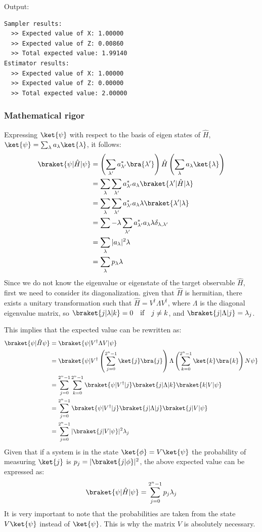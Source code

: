 \documentclass[12pt, oneside]{book}
\theoremstyle{definition}
\theoremstyle{definition}
\theoremstyle{remark}
\begin{document}
Output:
\begin{lstlisting}
Sampler results:
  >> Expected value of X: 1.00000
  >> Expected value of Z: 0.00860
  >> Total expected value: 1.99140
Estimator results:
  >> Expected value of X: 1.00000
  >> Expected value of Z: 0.00000
  >> Total expected value: 2.00000
\end{lstlisting}
\subsubsection{Mathematical rigor}
Expressing $\ket{\psi}$ with respect to the basis of eigen states of $\hat{H}$,$\ket{\psi}=\sum_{\lambda}a_{\lambda}\ket{\lambda}$, it follows:
\begin{align*}
\braket{\psi|\hat{H}|\psi}&=\left(\sum_{\lambda'}a_{\lambda'}^*\bra{\lambda'}\right)\hat{H}\left(\sum_{\lambda}a_{\lambda}\ket{\lambda}\right)\\
&=\sum_{\lambda}\sum_{\lambda'} a_{\lambda'}^*a_{\lambda} \braket{\lambda'|\hat{H}|\lambda}\\
&=\sum_{\lambda}\sum_{\lambda'}a_{\lambda'}^*a_{\lambda}\lambda \braket{\lambda'|\lambda}\\
&=\sum-{\lambda}\sum_{\lambda'}a_{\lambda'}^*a_{\lambda}\lambda\delta_{\lambda,\lambda'}\\
&=\sum_{\lambda}|a_{\lambda}|^2\lambda\\
&=\sum_{\lambda}p_{\lambda}\lambda
\end{align*}
Since we do not know the eigenvalue or eigenstate of the target observable $\hat{H}$, first we need to consider its diagonalization. given that $\hat{H}$ is hermitian, there exists a unitary transformation such that $\hat{H}=V^{\dagger}\Lambda V^{\dagger}$, where $\Lambda$ is the diagonal eigenvalue matrix, so $\braket{j|\lambda|k}=0 \quad \text{if} \quad j\neq k$, and $\braket{j|\Lambda|j}=\lambda_j$.

This implies that the expected value can be rewritten as:
\begin{align*}
    \braket{\psi|\hat{H}\psi}&=\braket{\psi|V^{\dagger}\Lambda V|\psi}\\
    &=\braket{\psi|V^{\dagger}\left(\sum_{j=0}^{2^n-1}\ket{j}\bra{j}\right)\Lambda\left(\sum_{k=0}^{2^n-1} \ket{k}\bra{k}\right)N\psi}\\
    &=\sum_{j=0}^{2^n-1}\sum_{k=0}^{2^n-1} \braket{\psi|V^{\dagger}|j}\braket{j|\Lambda|k}\braket{k|V|\psi}\\
    &=\sum_{j=0}^{2^n-1} \braket{\psi|V^{\dagger}|j}\braket{j|\Lambda|j}\braket{j|V|\psi}\\
    &=\sum_{j=0}^{2^n-1}|\braket{j|V|\psi}|^2\lambda_j
\end{align*}
Given that if a system is in the state $\ket{\phi}=V\ket{\psi}$ the probability of measuring $\ket{j}$ is $p_j=|\braket{j|\phi}|^2$, the above expected value can be expressed as:
\[
\braket{\psi|\hat{H}|\psi}=\sum_{j=0}^{2^n-1}p_j\lambda_j
\]
It is very important to note that the probabilities are taken from the state $V\ket{\psi}$ instead of $\ket{\psi}$. This is why the matrix $V$ is absolutely necessary.
\end{document}
